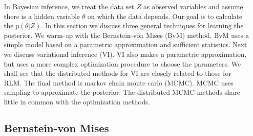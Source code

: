 \documentclass[thesis.tex]{subfiles}
\begin{document}
In Bayesian inference, 
we treat the data set $Z$ as observed variables and assume there is a hidden variable $\theta$ on which the data depends.
Our goal is to calculate the  $p(\theta | Z)$.
In this section we discuss three general techniques for learning the posterior.
We warm-up with the Bernstein-von Mises (BvM) method.
BvM uses a simple model based on a parametric approximation and sufficient statistics.
Next we discuss variational inference (VI).
VI also makes a parametric approximation,
but uses a more complex optimization procedure to choose the parameters.
We shall see that the distributed methods for VI are closely related to those for RLM.
The final method is markov chain monte carlo (MCMC).
MCMC uses sampling to approximate the posterior.
The distributed MCMC methods share little in common with the optimization methods.



\subsection{Bernstein-von Mises}
\label{sec:merge:bvm}
\end{document}
